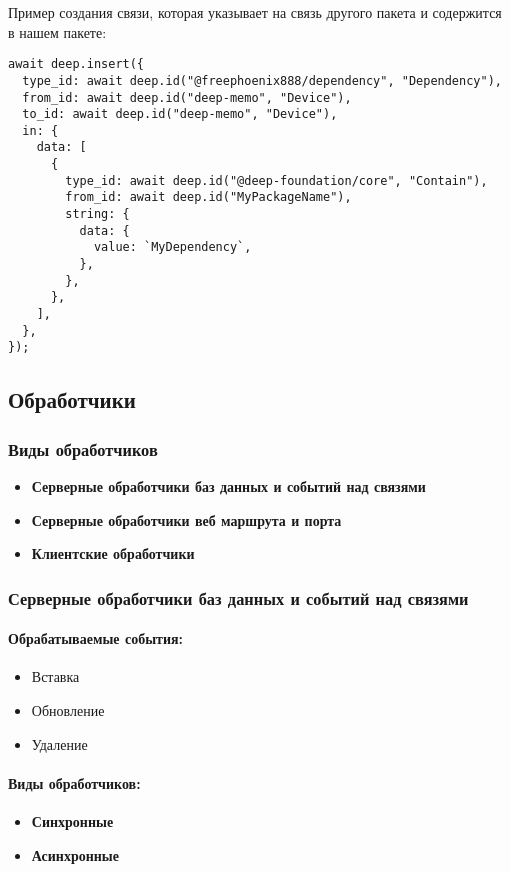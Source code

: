 \documentclass{article}
\begin{document}
Пример создания связи, которая указывает на связь другого пакета и содержится в
нашем пакете:

\begin{lstlisting}
await deep.insert({
  type_id: await deep.id("@freephoenix888/dependency", "Dependency"),
  from_id: await deep.id("deep-memo", "Device"),
  to_id: await deep.id("deep-memo", "Device"),
  in: {
    data: [
      {
        type_id: await deep.id("@deep-foundation/core", "Contain"),
        from_id: await deep.id("MyPackageName"),
        string: {
          data: {
            value: `MyDependency`,
          },
        },
      },
    ],
  },
});
\end{lstlisting}

\subsection{Обработчики}

\subsubsection{Виды обработчиков}
\begin{itemize}
  \item \textbf{Серверные обработчики баз данных и событий над связями}
  \item \textbf{Серверные обработчики веб маршрута и порта}
  \item \textbf{Клиентские обработчики}
\end{itemize}

\subsubsection{Серверные обработчики баз данных и событий над связями}
\paragraph{Обрабатываемые события:}
\begin{itemize}
  \item Вставка
  \item Обновление
  \item Удаление
\end{itemize}
\paragraph{Виды обработчиков:}
\begin{itemize}
  \item \textbf{Синхронные}
  \item \textbf{Асинхронные}
\end{itemize}
\end{document}
